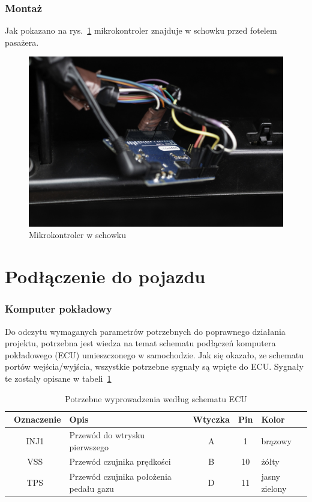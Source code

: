 \subsubsection{Montaż}
\par Jak pokazano na rys.~\ref{fig:arduino_schowek} mikrokontroler znajduje w schowku przed fotelem pasażera.

\begin{figure}[!htb]
\centering
\includegraphics[width=0.8\linewidth]{Rysunki/arduino_schowek.jpg}
\caption{Mikrokontroler w schowku}
\label{fig:arduino_schowek}
\end{figure}

\section{Podłączenie do pojazdu}
\subsubsection{Komputer pokładowy}
Do odczytu wymaganych parametrów potrzebnych do poprawnego działania projektu, potrzebna jest wiedza na temat schematu podłączeń komputera pokładowego (ECU) umieszczonego w samochodzie. Jak się okazało, ze schematu portów wejścia/wyjścia\cite{HondaPinout}, wszystkie potrzebne sygnały są wpięte do ECU. Sygnały te zostały opisane w tabeli~\ref{tab:ecu_pinout}

\begin{table}[htb] \small
\centering
\caption{Potrzebne wyprowadzenia według schematu ECU\cite{HondaPinout}}
\label{tab:ecu_pinout}
\begin{tabularx}{\linewidth}{|c|p{7cm}|c|c|X|} \hline\
\textbf{Oznaczenie} & \textbf{Opis} & \textbf{Wtyczka} &\textbf{ Pin} & \textbf{Kolor} \\ 
\hline
INJ1 & Przewód do wtrysku pierwszego & A & 1 & brązowy\\
\hline
VSS & Przewód czujnika prędkości & B & 10 & żółty\\
\hline
TPS & Przewód czujnika położenia pedału gazu & D & 11 & jasny zielony\\
\hline
\end{tabularx}
\end{table}

